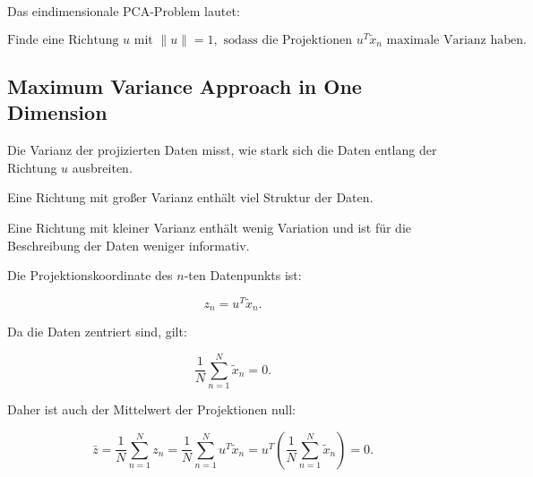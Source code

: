 \documentclass[11pt,a4paper]{scrartcl}
\begin{document}
\begin{answerbox}
    Das eindimensionale PCA-Problem lautet:

    \[
        \boxed{
            \text{Finde eine Richtung } u
            \text{ mit } \|u\|=1,
            \text{ sodass die Projektionen } u^T\tilde x_n
            \text{ maximale Varianz haben.}
        }
    \]
\end{answerbox}

\subsection{Maximum Variance Approach in One Dimension}

\begin{notebox}
    Die Varianz der projizierten Daten misst, wie stark sich die Daten entlang
    der Richtung \(u\) ausbreiten.

    Eine Richtung mit großer Varianz enthält viel Struktur der Daten.

    Eine Richtung mit kleiner Varianz enthält wenig Variation und ist für die
    Beschreibung der Daten weniger informativ.
\end{notebox}

\begin{calculationbox}
    Die Projektionskoordinate des \(n\)-ten Datenpunkts ist:

    \[
        z_n
        =
        u^T\tilde x_n.
    \]

    Da die Daten zentriert sind, gilt:

    \[
        \frac{1}{N}
        \sum_{n=1}^{N}
        \tilde x_n
        =
        0.
    \]

    Daher ist auch der Mittelwert der Projektionen null:

    \[
        \bar z
        =
        \frac{1}{N}
        \sum_{n=1}^{N}
        z_n
        =
        \frac{1}{N}
        \sum_{n=1}^{N}
        u^T\tilde x_n
        =
        u^T
        \left(
            \frac{1}{N}
            \sum_{n=1}^{N}
            \tilde x_n
        \right)
        =
        0.
    \]
\end{calculationbox}
\end{document}
